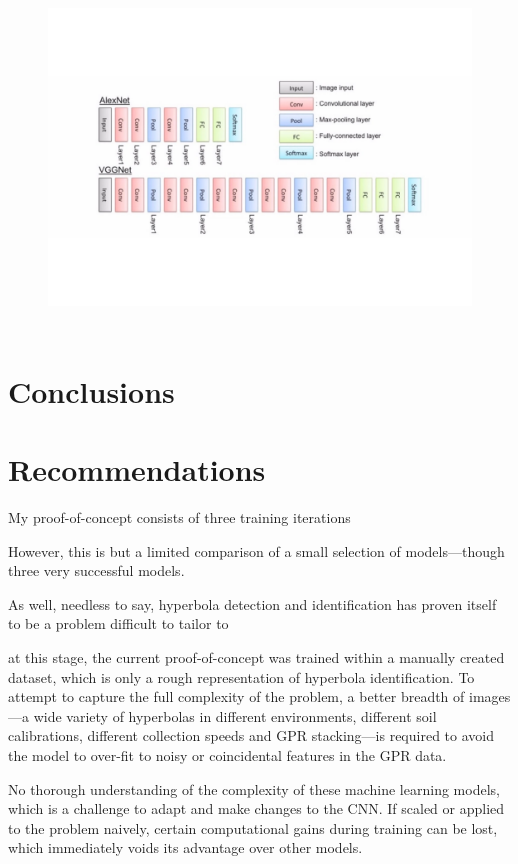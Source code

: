 \documentclass[se,blockletter]{uw-wkrpt}
\begin{document}
\begin{figure}
  \centering
  \includegraphics[height=8cm]{VGG-vs-AlexNet}
  \caption{~\cite{ref:}}
  \label{fig:VGG-vs-AlexNet}
\end{figure}


\section{Conclusions}


\section{Recommendations}
My proof-of-concept consists of three training iterations


However, this is but a limited comparison of a small selection of models---though three very successful models. 


As well, needless to say, 
hyperbola detection and identification has proven itself to be a problem difficult to tailor to 


at this stage, the current proof-of-concept was trained within a manually created dataset, which is only a rough representation of hyperbola identification. To attempt to capture the full complexity of the problem, a better breadth of images---a wide variety of hyperbolas in different environments, different soil calibrations, different collection speeds and GPR stacking---is required to avoid the model to over-fit to noisy or coincidental features in the GPR data.


No thorough understanding of the complexity of these machine learning models, which is a challenge to adapt and make changes to the CNN.
If scaled or applied to the problem naively, certain computational gains during training can be lost, which immediately voids its advantage over other models. 
\end{document}
